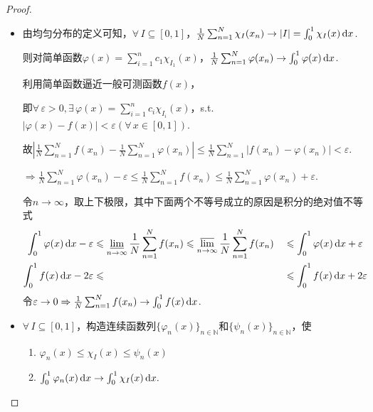 \begin{proof}
    \begin{itemize}
        \item[“$\Rightarrow$”] 由均匀分布的定义可知，$\forall\, I \subseteq [0,1]$，$\frac{1}{N}\sum_{n=1}^N{\chi_{I}(x_n)} \to |I| = \int_0^1{\chi_{I}(x)}\mathop{}\!\mathrm{d} x$.\par
        则对简单函数$\varphi(x)=\sum_{i=1}^n{c_1\chi_{I_1}(x)}$，$\frac{1}{N}\sum_{n=1}^N{\varphi(x_n)}\to \int_{0}^{1}{\varphi(x)}\mathop{}\!\mathrm{d} x$.\par
        利用简单函数逼近一般可测函数$f(x)$， \par
        即$\forall\, \varepsilon>0,\exists\, \varphi(x)=\sum_{i=1}^n{c_i\chi_{I_i}(x)}$，s.t. $|\varphi(x)-f(x)| < \varepsilon(\forall\, x\in [0,1])$.\par
        故$\left\lvert \frac{1}{N}\sum_{n=1}^N{f(x_n)} - \frac{1}{N}\sum_{n=1}^N{\varphi(x_n)} \right\rvert \leqslant \frac{1}{N}\sum_{n=1}^N{\left\lvert f(x_n)-\varphi(x_n) \right\rvert} < \varepsilon$.\par
        $\Rightarrow \frac{1}{N}\sum_{n=1}^N{\varphi(x_n)} - \varepsilon \leq \frac{1}{N}\sum_{n=1}^N{f(x_n)} \leq \frac{1}{N}\sum_{n=1}^N{\varphi(x_n)} + \varepsilon$.\par
        令$n\to\infty$，取上下极限，其中下面两个不等号成立的原因是积分的绝对值不等式
        \begin{alignat*}{2}
            \int_0^1{\varphi(x)}\mathop{}\!\mathrm{d} x - \varepsilon &\leqslant \varliminf_{n\to\infty}{\frac{1}{N}\sum_{n=1}^N{f(x_n)}} \leqslant \varlimsup_{n\to\infty}{\frac{1}{N}\sum_{n=1}^N{f(x_n)}} &&\leqslant \int_0^1{\varphi(x)}\mathop{}\!\mathrm{d} x + \varepsilon  \\
            \int_0^1{f(x)}\mathop{}\!\mathrm{d} x - 2\varepsilon &\leqslant &&\leqslant \int_0^1{f(x)}\mathop{}\!\mathrm{d} x + 2\varepsilon
        \end{alignat*}
        令$\varepsilon\to 0 \Rightarrow \frac{1}{N}\sum_{n=1}^N{f(x_n)}\to \int_{0}^{1}{f(x)}\mathop{}\!\mathrm{d} x$.\par
    \end{itemize}
    \begin{minipage}[t]{0.74\textwidth}
    \begin{itemize}
        \item[“$\Leftarrow$"] $\forall\, I \subseteq [0,1]$，构造连续函数列$\{\varphi_n(x)\}_{n\in\mathbb{N}}$和$\{\psi_n(x)\}_{n\in\mathbb{N}}$，使
        \begin{enumerate}[(1)]
            \item $\varphi_n(x) \leq \chi_{I}(x) \leq \psi_n(x)$
            \item $\int_0^1{\varphi_n(x)}\mathop{}\!\mathrm{d} x \to \int_0^1{\chi_{I}(x)}\mathop{}\!\mathrm{d} x.$\par

\end{enumerate}
\end{itemize}
\end{minipage}
\end{proof}
